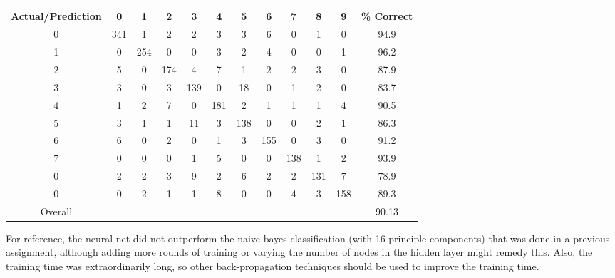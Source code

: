 \documentclass{article}
\begin{document}
\begin{tabular}{| c || c | c | c | c | c | c | c | c | c | c | c |}
  \hline
  Actual/Prediction &   0 &   1 &   2 &   3 &   4 &   5 &   6 &   7 &   8 &   9 &\% Correct \\
  \hline
  \hline
  0                 & 341 &   1 &   2 &   2 &   3 &   3 &   6 &   0 &   1 &   0 & 94.9 \\
  \hline
  1                 &   0 & 254 &   0 &   0 &   3 &   2 &   4 &   0 &   0 &   1 & 96.2 \\
  \hline
  2                 &   5 &   0 & 174 &   4 &   7 &   1 &   2 &   2 &   3 &   0 & 87.9 \\
  \hline
  3                 &   3 &   0 &   3 & 139 &   0 &  18 &   0 &   1 &   2 &   0 & 83.7 \\
  \hline
  4                 &   1 &   2 &   7 &   0 & 181 &   2 &   1 &   1 &   1 &   4 & 90.5 \\
  \hline
  5                 &   3 &   1 &   1 &  11 &   3 & 138 &   0 &   0 &   2 &   1 & 86.3 \\
  \hline
  6                 &   6 &   0 &   2 &   0 &   1 &   3 & 155 &   0 &   3 &   0 & 91.2 \\
  \hline
  7                 &   0 &   0 &   0 &   1 &   5 &   0 &   0 & 138 &   1 &   2 & 93.9 \\
  \hline
  0                 &   2 &   2 &   3 &   9 &   2 &   6 &   2 &   2 & 131 &   7 & 78.9 \\
  \hline
  0                 &   0 &   2 &   1 &   1 &   8 &   0 &   0 &   4 &   3 & 158 & 89.3 \\
  \hline
  \hline
  Overall           & & & & & & & & & &                                         & 90.13 \\
  \hline
\end{tabular}

For reference, the neural net did not outperform the naive bayes classification (with 16 principle components) that was done in a previous assignment, although adding more rounds of training or varying the number of nodes in the hidden layer might remedy this. Also, the training time was extraordinarily long, so other back-propagation techniques should be used to improve the training time.

%
\end{document}
